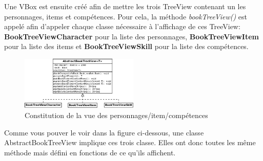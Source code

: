 			Une VBox est ensuite créé afin de mettre les trois TreeView contenant un les personnages, items et compétences. Pour cela, la méthode \textit{bookTreeView()} est appelé afin d'appeler chaque classe nécessaire à l'affichage de ces TreeView: \textbf{BookTreeViewCharacter} pour la liste des personnages, \textbf{BookTreeViewItem} pour la liste des items et \textbf{BookTreeViewSkill} pour la liste des compétences.

			\begin{figure}[H]
				\centering\includegraphics[width=0.50\textwidth]{img/fenetreTreeView.png}
				\caption{Constitution de la vue des personnages/item/compétences}
				\label{fig:fenetreTreeView}
			\end{figure}

			Comme vous pouver le voir dans la figure ci-dessous, une classe AbstractBookTreeView implique ces trois classe. Elles ont donc toutes les même méthode mais défini en fonctions de ce qu'ils affichent.

